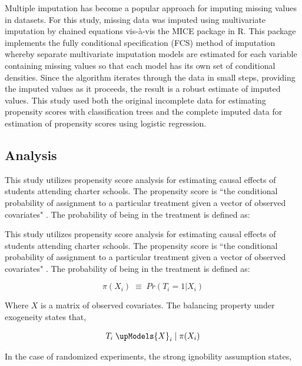 \documentclass[letterpaper,12p,twoside]{article} %
\begin{document}
Multiple imputation \cite{rubin1987,Rubin1996mi} has become a popular approach for imputing missing values in datasets. For this study, missing data was imputed using multivariate imputation by chained equations vis-\`{a}-vis the MICE package \cite{mice,vanbuuren} in R. This package implements the fully conditional specification (FCS) method of imputation whereby separate multivariate imputation models are estimated for each variable containing missing values so that each model has its own set of conditional densities. Since the algorithm iterates through the data in small steps, providing the imputed values as it proceeds, the result is a robust estimate of imputed values. This study used both the original incomplete data for estimating propensity scores with classification trees and the complete imputed data for estimation of propensity scores using logistic regression.


\subsection{Analysis}

This study utilizes propensity score analysis for estimating causal effects of students attending charter schools. The propensity score is ``the conditional probability of assignment to a particular treatment given a vector of observed covariates" \cite{RosenbaumRubin1983}. The probability of being in the treatment is defined as:

This study utilizes propensity score analysis for estimating causal effects of students attending charter schools. The propensity score is ``the conditional probability of assignment to a particular treatment given a vector of observed covariates" \cite{RosenbaumRubin1983}. The probability of being in the treatment is defined as:

\begin{equation}
\pi ({ X }_{ i }) \; \equiv \; Pr({ T }_{ i } = 1 | { X }_{ i })
\end{equation}

\noindent Where $X$ is a matrix of observed covariates. The balancing property under exogeneity states that,

\begin{equation}
{ T }_{ i } \; \upModels { X }_{ i } \;| \; \pi ({ X }_{ i })
\end{equation}

\noindent In the case of randomized experiments, the strong ignobility assumption states,
\end{document}
